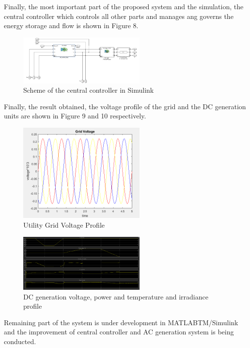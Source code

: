 \documentclass[journal,twoside]{IEEEtran}
\begin{document}
Finally, the most important part of the
proposed system and the simulation, the central
controller which controls all other parts and manages
ang governs the energy storage and flow is shown in
Figure 8.

\begin{figure}[!ht]
\centering
\includegraphics[width=2.5in]{8}
\caption{Scheme of the central controller in Simulink}
\label{f8}
\end{figure}
Finally, the result obtained, the
voltage profile of the grid and the DC generation units
are shown in Figure 9 and 10 respectively.

\begin{figure}[!ht]
\centering
\includegraphics[width=2.5in]{9}
\caption{Utility Grid Voltage Profile}
\label{f9}
\end{figure}

\begin{figure}[!ht]
\centering
\includegraphics[width=2.5in]{10}
\caption{DC generation voltage, power and temperature and irradiance profile}
\label{f10}
\end{figure}


Remaining part of the system is under
development in MATLABTM/Simulink and the
improvement of central controller and AC generation
system is being conducted.
\end{document}
